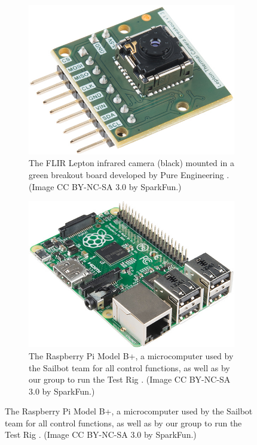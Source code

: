 \begin{figure}
\centering

\begin{subfigure}{.50\textwidth}
\centering
\includegraphics[width=.90\linewidth]{"./image/lepton"}
\caption[FLIR Lepton]{\label{fig:lepton}The FLIR Lepton infrared camera (black) mounted in a green breakout board developed by Pure Engineering \cite{pure-eng}. (Image CC BY-NC-SA 3.0 by SparkFun.)}
\end{subfigure}%
\begin{subfigure}{.50\textwidth}
\centering
\includegraphics[width=.90\linewidth]{"./image/raspberry-pi"}
\caption[Raspberry Pi]{\label{fig:rpi}The Raspberry Pi Model B+, a microcomputer used by the Sailbot team for all control functions, as well as by our group to run the Test Rig \cite{rpi}. (Image CC BY-NC-SA 3.0 by SparkFun.)}
\end{subfigure}


\end{figure}

